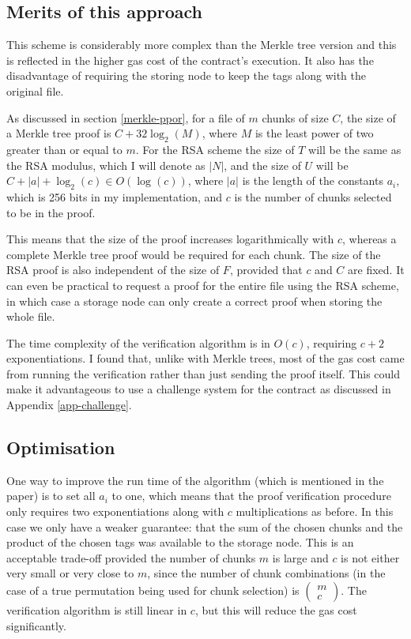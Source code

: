 \documentclass[12pt,a4paper,twoside,openright]{report}
\begin{document}
\subsection{Merits of this approach}

This scheme is considerably more complex than the Merkle tree version and this is reflected in the higher gas cost of the contract's execution.
It also has the disadvantage of requiring the storing node to keep the tags along with the original file.

As discussed in section \ref{merkle-ppor}, for a file of $m$ chunks of size $C$, the size of a Merkle tree proof is $C + 32 \log_2(M)$, where $M$ is the least power of two greater than or equal to $m$.
For the RSA scheme the size of $T$ will be the same as the RSA modulus, which I will denote as $|N|$,
and the size of $U$ will be $C + |a| + \log_2(c) \in O(\log(c))$, where $|a|$ is the length of the constants $a_i$, which is 256 bits in my implementation,
and $c$ is the number of chunks selected to be in the proof.

This means that the size of the proof increases logarithmically with $c$,
whereas a complete Merkle tree proof would be required for each chunk.
The size of the RSA proof is also independent of the size of $F$, provided that $c$ and $C$ are fixed.
It can even be practical to request a proof for the entire file using the RSA scheme,
in which case a storage node can only create a correct proof when storing the whole file.

The time complexity of the verification algorithm is in $O(c)$, requiring $c+2$ exponentiations.
I found that, unlike with Merkle trees, most of the gas cost came from running the verification rather than just sending the proof itself.
This could make it advantageous to use a challenge system for the contract as discussed in Appendix \ref{app-challenge}.

\subsection{Optimisation} \label{RSA-ext-opt}

One way to improve the run time of the algorithm (which is mentioned in the paper) is to set all $a_i$ to one,
which means that the proof verification procedure only requires two exponentiations along with $c$ multiplications as before.
In this case we only have a weaker guarantee: that the sum of the chosen chunks and the product of the chosen tags was available to the storage node.
This is an acceptable trade-off provided the number of chunks $m$ is large and $c$ is not either very small or very close to $m$,
since the number of chunk combinations (in the case of a true permutation being used for chunk selection) is $\begin{pmatrix}m\\c\end{pmatrix}$.
The verification algorithm is still linear in $c$, but this will reduce the gas cost significantly.
\end{document}
